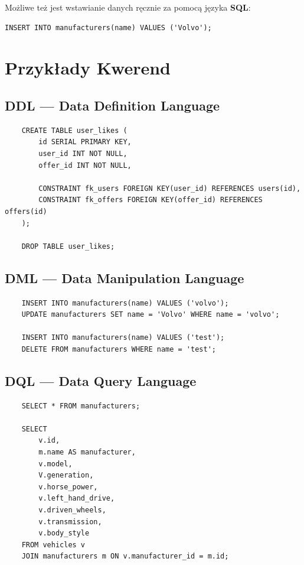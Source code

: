 \documentclass[a4paper,11pt]{article}
\begin{document}
Możliwe też jest wstawianie danych ręcznie za pomocą języka \textbf{SQL}:

\begin{verbatim}
INSERT INTO manufacturers(name) VALUES ('Volvo');
\end{verbatim}

\section*{Przykłady Kwerend}
\subsection*{DDL --- Data Definition Language}
\begin{verbatim}
    CREATE TABLE user_likes (
        id SERIAL PRIMARY KEY,
        user_id INT NOT NULL,
        offer_id INT NOT NULL,
        
        CONSTRAINT fk_users FOREIGN KEY(user_id) REFERENCES users(id),
        CONSTRAINT fk_offers FOREIGN KEY(offer_id) REFERENCES offers(id)
    );

    DROP TABLE user_likes;
\end{verbatim}

\subsection*{DML --- Data Manipulation Language}
\begin{verbatim}
    INSERT INTO manufacturers(name) VALUES ('volvo');
    UPDATE manufacturers SET name = 'Volvo' WHERE name = 'volvo';

    INSERT INTO manufacturers(name) VALUES ('test');
    DELETE FROM manufacturers WHERE name = 'test';
\end{verbatim}

\pagebreak
\subsection*{DQL --- Data Query Language}
\begin{verbatim}
    SELECT * FROM manufacturers;

    SELECT 
        v.id, 
        m.name AS manufacturer,
        v.model,
        V.generation,
        v.horse_power,
        v.left_hand_drive,
        v.driven_wheels,
        v.transmission,
        v.body_style
    FROM vehicles v
    JOIN manufacturers m ON v.manufacturer_id = m.id;
\end{verbatim}
\end{document}

